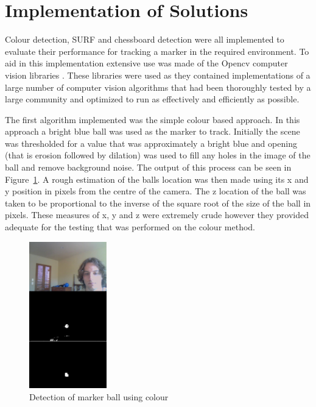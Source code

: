 \section{Implementation of Solutions}

Colour detection, SURF and chessboard detection were all implemented to evaluate their performance for tracking a marker in the required environment. To aid in this implementation extensive use was made of the Opencv computer vision libraries \cite{opencv}. These libraries were used as they contained implementations of a large number of computer vision algorithms that had been thoroughly tested by a large community and optimized to run as effectively and efficiently as possible.

The first algorithm implemented was the simple colour based approach. In this approach a bright blue ball was used as the marker to track. Initially the scene was thresholded for a value that was approximately a bright blue and opening (that is erosion followed by dilation) was used to fill any holes in the image of the ball and remove background noise. The output of this process can be seen in Figure~\ref{ball}. A rough estimation of the balls location was then made using its x and y position in pixels from the centre of the camera. The z location of the ball was taken to be proportional to the inverse of the square root of the size of the ball in pixels. These measures of x, y and z were extremely crude however they provided adequate for the testing that was performed on the colour method.

\begin{figure}[ht]
	\begin{center}
		\includegraphics[width=0.3\textwidth]{2}
	\end{center}
	\caption{Detection of marker ball using colour}
	\label{ball}
\end{figure}

